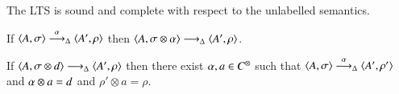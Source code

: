 \documentclass[main.tex]{subfiles}
\begin{document}
The LTS is sound and complete with respect to the unlabelled semantics. 


\begin{lemma}[Soundness]\label{lemma:soundness}
If $\langle A,\sigma \rangle \stackrel{\alpha}{\longrightarrow}_\Delta \langle A',\rho \rangle$ then $\langle A,\sigma \otimes \alpha \rangle \stackrel{}{\longrightarrow}_\Delta \langle A',\rho \rangle$.
\end{lemma}

\begin{lemma}[Completeness]\label{lemma:completeness}
If $\langle A,\sigma \otimes d \rangle \stackrel{}{\longrightarrow}_\Delta \langle A',\rho \rangle$ then there exist $\alpha, a \in C^\otimes$ such that
$\langle A,\sigma \rangle \stackrel{\alpha}{\longrightarrow}_\Delta \langle A',\rho' \rangle$ and $\alpha \otimes a = d$ and $\rho' \otimes a = \rho$.
\end{lemma}
\end{document}
